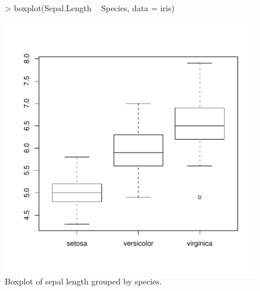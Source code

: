 \documentclass[a4paper]{article}
\begin{document}
\begin{figure}[tbph]
\begin{center}
\begin{Sinput}
> boxplot(Sepal.Length ~ Species, data = iris)
\end{Sinput}
\includegraphics{Sweave-test-1-007}
\end{center}
\caption{Boxplot of sepal length grouped by species.}
\end{figure}

\end{document}
